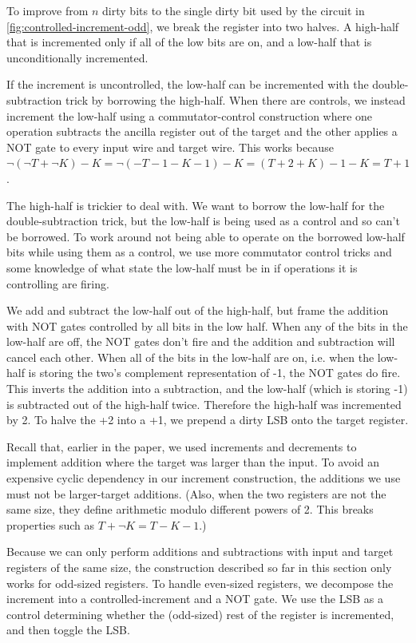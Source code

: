 \documentclass[twocolumn,longbibliography]{quantumarticle-customized}
\begin{document}
To improve from $n$ dirty bits to the single dirty bit used by the circuit in \autoref{fig:controlled-increment-odd}, we break the register into two halves.
A high-half that is incremented only if all of the low bits are on, and a low-half that is unconditionally incremented.

If the increment is uncontrolled, the low-half can be incremented with the double-subtraction trick by borrowing the high-half.
When there are controls, we instead increment the low-half using a commutator-control construction where one operation subtracts the ancilla register out of the target and the other applies a NOT gate to every input wire and target wire.
This works because $\lnot (\lnot T + \lnot K) - K = \lnot (-T - 1 - K - 1) - K = (T+2+K) - 1 - K = T + 1$.

The high-half is trickier to deal with.
We want to borrow the low-half for the double-subtraction trick, but the low-half is being used as a control and so can't be borrowed.
To work around not being able to operate on the borrowed low-half bits while using them as a control, we use more commutator control tricks and some knowledge of what state the low-half must be in if operations it is controlling are firing.

We add and subtract the low-half out of the high-half, but frame the addition with NOT gates controlled by all bits in the low half.
When any of the bits in the low-half are off, the NOT gates don't fire and the addition and subtraction will cancel each other.
When all of the bits in the low-half are on, i.e. when the low-half is storing the two's complement representation of -1, the NOT gates do fire.
This inverts the addition into a subtraction, and the low-half (which is storing -1) is subtracted out of the high-half twice.
Therefore the high-half was incremented by 2.
To halve the +2 into a +1, we prepend a dirty LSB onto the target register.

Recall that, earlier in the paper, we used increments and decrements to implement addition where the target was larger than the input.
To avoid an expensive cyclic dependency in our increment construction, the additions we use must not be larger-target additions.
(Also, when the two registers are not the same size, they define arithmetic modulo different powers of 2.
This breaks properties such as $T + \lnot K = T - K - 1$.)

Because we can only perform additions and subtractions with input and target registers of the same size, the construction described so far in this section only works for odd-sized registers.
To handle even-sized registers, we decompose the increment into a controlled-increment and a NOT gate.
We use the LSB as a control determining whether the (odd-sized) rest of the register is incremented, and then toggle the LSB.
\end{document}
